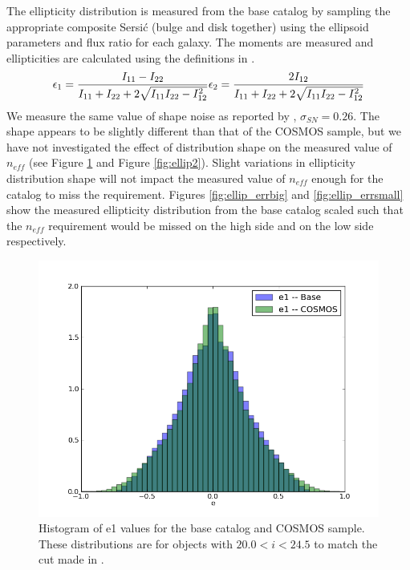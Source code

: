 \documentclass[]{article}
\begin{document}
{The ellipticity distribution is measured from the base catalog by sampling the appropriate composite Sersi{\'c} (bulge and disk together) using the
ellipsoid parameters and flux ratio for each galaxy.  The moments are measured and ellipticities are calculated using the definitions in \citet{chang}.
\begin{equation}
\epsilon_1 = \frac{I_{11}-I_{22}}{I_{11}+I_{22}+2\sqrt{I_{11}I_{22} - I^{2}_{12}}}\\
\epsilon_2 = \frac{2I_{12}}{I_{11}+I_{22}+2\sqrt{I_{11}I_{22} - I^{2}_{12}}}
\end{equation}
We measure the same value of shape noise as reported by \citet{chang}, $\sigma_{SN} = 0.26$.  The shape appears to be slightly different than
that of the COSMOS sample, but we have not investigated the effect of distribution shape on the measured value of $n_{eff}$ (see Figure \ref{fig:ellip1} 
and Figure \ref{fig:ellip2}).  
Slight variations in
ellipticity distribution shape will not impact the measured value of $n_{eff}$ enough for the catalog to miss the requirement.  Figures \ref{fig:ellip_errbig}
and \ref{fig:ellip_errsmall} show the measured ellipticity distribution from the base catalog scaled such that the $n_{eff}$ requirement would be missed on the high side 
and on the low side respectively.
\begin{figure}[H]
\centering
\includegraphics[width=5in]{validation_figures/e1_hist.png}
\caption{Histogram of e1 values for the base catalog and COSMOS sample.  These distributions are for objects with $20.0 < i < 24.5$ to match
the cut made in \citet{chang}.\label{fig:ellip1}}
\end{figure}
\begin{figure}[H]

\end{figure}}
\end{document}
